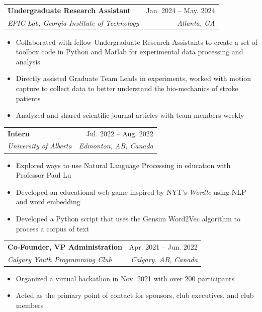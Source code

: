 \documentclass[letterpaper,11pt]{article}
\makeatletter
\newcommand{\resumeItem}[1]{
  \item\small{
    {#1 \vspace{-2pt}}
  }
}
\newcommand{\resumeSubheading}[4]{
  \vspace{-2pt}\item
    \begin{tabular*}{0.97\textwidth}[t]{l@{\extracolsep{\fill}}r}
      \textbf{\small#1} & \small #2 \\
      \textit{\small#3} & \textit{\small #4} \\
    \end{tabular*}\vspace{-5pt}
}
\newcommand{\resumeSubSubheading}[2]{
    \item
    \begin{tabular*}{0.97\textwidth}{l@{\extracolsep{\fill}}r}
      \textit{\small#1} & \textit{\small #2} \\
    \end{tabular*}\vspace{-5pt}
}
\newcommand{\resumeSubHeadingListEnd}{\end{itemize}}
\newcommand{\resumeItemListStart}{\begin{itemize}}
\newcommand{\resumeItemListEnd}{\end{itemize}\vspace{-5pt}}
\makeatother
\begin{document}

    \resumeSubheading
      {Undergraduate Research Assistant}{Jan. 2024 -- May. 2024}
      {EPIC Lab, Georgia Institute of Technology}{Atlanta, GA}
      \resumeItemListStart
        \resumeItem{Collaborated with fellow Undergraduate Research Assistants to create a set of toolbox code in Python and Matlab for experimental data processing and analysis}
        \resumeItem{Directly assisted Graduate Team Leads in experiments, worked with motion capture to collect data to better understand the bio-mechanics of stroke patients}
        \resumeItem{Analyzed and shared scientific journal articles with team members weekly}
    \resumeItemListEnd

    \resumeSubheading
      {Intern}{Jul. 2022 -- Aug. 2022}
      {University of Alberta}{Edmonton, AB, Canada}
      \resumeItemListStart
        \resumeItem{Explored ways to use Natural Language Processing in education with Professor Paul Lu}
        \resumeItem{Developed an educational web game inspired by NYT's \emph{Wordle} using NLP and word embedding}
        \resumeItem{Developed a Python script that uses the Gensim Word2Vec algorithm to process a corpus of text}
      \resumeItemListEnd
    \resumeSubheading
      {Co-Founder, VP Administration}{Apr. 2021 -- Jun. 2022}
      {Calgary Youth Programming Club}{Calgary, AB, Canada}
      \resumeItemListStart
        \resumeItem{Organized a virtual hackathon in Nov. 2021 with over 200 participants}
        \resumeItem{Acted as the primary point of contact for sponsors, club executives, and club members}
      \resumeItemListEnd
\end{document}
